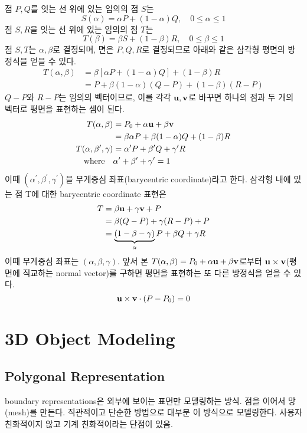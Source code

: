 점 $P, Q$를 잇는 선 위에 있는 임의의 점 $S$는
$$S(\alpha) = \alpha P + (1 - \alpha)Q, \quad 0 \leq \alpha \leq 1$$
점 $S, R$을 잇는 선 위에 있는 임의의 점 $T$는
$$T(\beta) = \beta S + (1 - \beta)R, \quad 0 \leq \beta \leq 1$$
점 $S, T$는 $\alpha, \beta$로 결정되며, 면은 $P, Q, R$로 결정되므로 아래와 같은 삼각형 평면의 방정식을 얻을 수 있다.
$$
\begin{aligned}
  T(\alpha, \beta) &= \beta[\alpha P + (1 - \alpha)Q] + (1 - \beta)R \\
  &= P + \beta(1 - \alpha)(Q - P) + (1 - \beta)(R - P)
\end{aligned}
$$
$Q - P$와 $R - P$는 임의의 벡터이므로, 이를 각각 $\bold{u}, \bold{v}$로 바꾸면 하나의 점과 두 개의 벡터로 평면을 표현하는 셈이 된다.
$$
\begin{aligned}
  T(\alpha, \beta) &= P_0 + \alpha \bold{u} + \beta \bold{v} \\
  &= \beta \alpha P + \beta(1 - \alpha)Q + (1 - \beta)R \\
  T(\alpha, \beta^\prime, \gamma) &= \alpha^\prime P + \beta^\prime Q + \gamma^\prime R \\
  \text{where} \quad &\alpha^\prime + \beta^\prime + \gamma^\prime = 1
\end{aligned}
$$
이때 $(\alpha^\prime, \beta^\prime, \gamma^\prime)$을 무게중심 좌표(barycentric coordinate)라고 한다. 삼각형 내에 있는 점 T에 대한 barycentric coordinate 표현은
$$
\begin{aligned}
  T &= \beta \bold{u} + \gamma \bold{v} + P \\
  &= \beta(Q - P) + \gamma(R - P) + P \\
  &= \underbrace{(1 - \beta - \gamma)}_{\alpha}P + \beta Q + \gamma R
\end{aligned}
$$
이때 무게중심 좌표는 $(\alpha, \beta, \gamma)$. 앞서 본 $T(\alpha, \beta) = P_0 + \alpha \bold{u} + \beta \bold{v}$로부터 $\bold{u} \times \bold{v}$(평면에 직교하는 normal vector)를 구하면 평면을 표현하는 또 다른 방정식을 얻을 수 있다.
$$\bold{u} \times \bold{v} \cdot (P - P_0) = 0$$

\section{3D Object Modeling}

\subsection{Polygonal Representation}

boundary representations은 외부에 보이는 표면만 모델링하는 방식. 점을 이어서 망(mesh)를 만든다. 직관적이고 단순한 방법으로 대부분 이 방식으로 모델링한다. 사용자 친화적이지 않고 기계 친화적이라는 단점이 있음.


